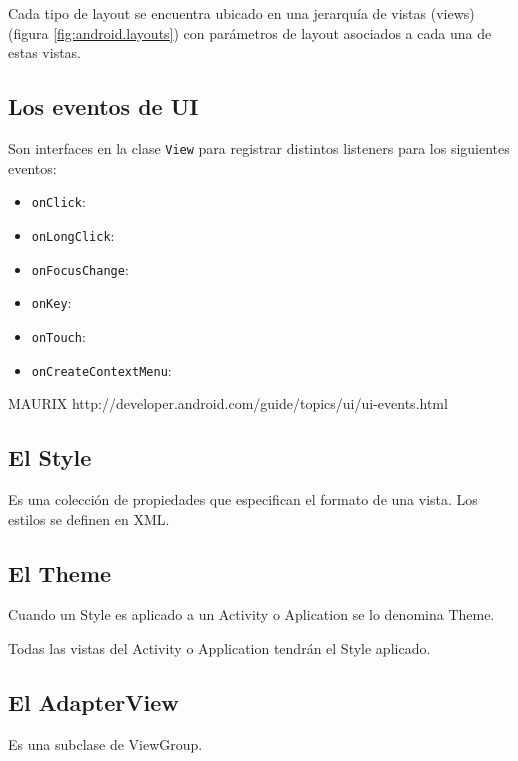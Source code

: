 Cada tipo de layout se encuentra ubicado en una jerarqu\'ia de vistas (views) (figura \ref{fig:android.layouts}) con par\'ametros de layout asociados a cada una de estas vistas. 


\subsection{Los eventos de \ac{UI}}
\label{subsec:dev.ui.events}

Son interfaces en la clase \texttt{View} para registrar distintos listeners para los siguientes eventos:

\begin{itemize}
\item \texttt{onClick}:
\item \texttt{onLongClick}:
\item \texttt{onFocusChange}:
\item \texttt{onKey}:
\item \texttt{onTouch}:
\item \texttt{onCreateContextMenu}:
\end{itemize}
MAURIX
http://developer.android.com/guide/topics/ui/ui-events.html

\subsection{El Style}
\label{subsec:dev.style}

Es una colecci\'on de propiedades que especifican el formato de una vista. Los estilos se definen en XML.

\subsection{El Theme}
\label{subsec:dev.theme}

Cuando un Style es aplicado a un Activity o Aplication se lo denomina Theme.

Todas las vistas del Activity o Application tendr\'an el Style aplicado.

\subsection{El AdapterView}
\label{subsec:dev.adapterView}

Es una subclase de ViewGroup.

